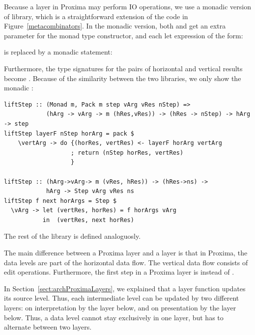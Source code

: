 \documentclass[preprint,natbib]{sigplanconf}
\begin{document}

Because a layer in Proxima may perform IO operations, we use a monadic version of library, which is a straightforward extension of the code in Figure~\ref{metacombinators}. In the monadic version, both  and  get an extra parameter  for the monad type constructor, and each let expression of the  form:


is replaced by a monadic statement:


Furthermore, the type signatures for the pairs of horizontal and vertical results  become . Because of the similarity between the two libraries, we only show the monadic :

\begin{small}
\begin{verbatim}
liftStep :: (Monad m, Pack m step vArg vRes nStep) => 
            (hArg -> vArg -> m (hRes,vRes)) -> (hRes -> nStep) -> hArg -> step
liftStep layerF nStep horArg = pack $ 
    \vertArg -> do {(horRes, vertRes) <- layerF horArg vertArg
                   ; return (nStep horRes, vertRes)
                   }

liftStep :: (hArg->vArg-> m (vRes, hRes)) -> (hRes->ns) ->
            hArg -> Step vArg vRes ns
liftStep f next horArgs = Step $ 
  \vArg -> let (vertRes, horRes) = f horArgs vArg
           in  (vertRes, next horRes)
\end{verbatim}
\end{small}%

The rest of the library is defined analoguosly.


The main difference between a Proxima layer and a  layer is that in Proxima, the data levels are part of the horizontal data flow. The vertical data flow consists of edit operations. Furthermore, the first step in a Proxima layer is  instead of .

In Section~\ref{sect:archProximaLayers}, we explained that a layer function updates its source level. Thus, each intermediate level can be updated by two different layers: on interpretation by the layer below, and on presentation by the layer below. Thus, a data level cannot stay exclusively in one layer, but has to alternate between two layers.
\end{document}
